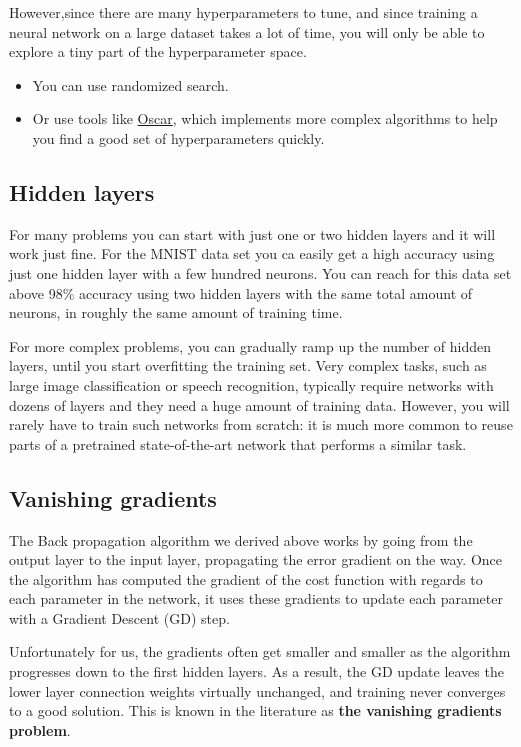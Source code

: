 \documentclass[%
oneside,                 %
final,                   %
10pt]{article}
\begin{document}
\noindent
However,since there are many hyperparameters to tune, and since
training a neural network on a large dataset takes a lot of time, you
will only be able to explore a tiny part of the hyperparameter space.

\begin{itemize}
\item You can use randomized search.

\item Or use tools like \href{{http://oscar.calldesk.ai/}}{Oscar}, which implements more complex algorithms to help you find a good set of hyperparameters quickly.  
\end{itemize}

\noindent
\subsection{Hidden layers}

For many problems you can start with just one or two hidden layers and
it will work just fine.  For the MNIST data set you ca easily get a
high accuracy using just one hidden layer with a few hundred neurons.
You can reach for this data set above 98\% accuracy using two hidden
layers with the same total amount of neurons, in roughly the same
amount of training time.

For more complex problems, you can gradually ramp up the number of
hidden layers, until you start overfitting the training set. Very
complex tasks, such as large image classification or speech
recognition, typically require networks with dozens of layers and they
need a huge amount of training data. However, you will rarely have to
train such networks from scratch: it is much more common to reuse
parts of a pretrained state-of-the-art network that performs a similar
task.

\subsection{Vanishing gradients}

The Back propagation algorithm we derived above works by going from
the output layer to the input layer, propagating the error gradient on
the way. Once the algorithm has computed the gradient of the cost
function with regards to each parameter in the network, it uses these
gradients to update each parameter with a Gradient Descent (GD) step.

Unfortunately for us, the gradients often get smaller and smaller as
the algorithm progresses down to the first hidden layers. As a result,
the GD update leaves the lower layer connection weights virtually
unchanged, and training never converges to a good solution. This is
known in the literature as \textbf{the vanishing gradients problem}.
\end{document}
